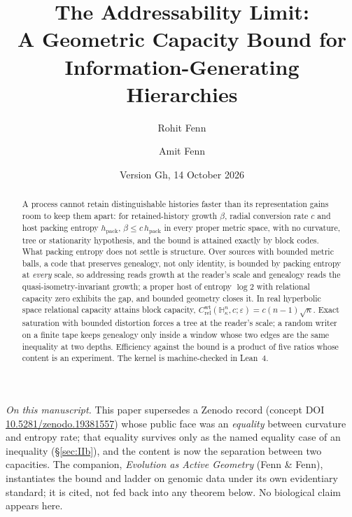 \documentclass[11pt,reqno]{amsart}
\theoremstyle{plain}
\theoremstyle{definition}
\newcommand{\hpack}{h_{\mathrm{pack}}}
\newcommand{\Crel}{C_{\mathrm{rel}}}
\newcommand{\Hk}{\mathbb{H}^n_\kappa}
\newcommand{\eps}{\varepsilon}
\begin{document}
\title[The Addressability Limit]{The Addressability Limit:\\ A Geometric Capacity Bound for Information-Generating Hierarchies}

\author{Rohit Fenn}
\author{Amit Fenn}
\address{Sentry Bio, Inc., USA}

\date{Version Gh, 14 October 2026}

\begin{abstract}
A process cannot retain distinguishable histories faster than its representation gains room to keep them apart: for retained-history growth $\beta$, radial conversion rate $c$ and host packing entropy $\hpack$, $\beta\le c\,\hpack$ in every proper metric space, with no curvature, tree or stationarity hypothesis, and the bound is attained exactly by block codes. What packing entropy does not settle is structure. Over sources with bounded metric balls, a code that preserves genealogy, not only identity, is bounded by packing entropy at \emph{every} scale, so addressing reads growth at the reader's scale and genealogy reads the quasi-isometry-invariant growth; a proper host of entropy $\log2$ with relational capacity zero exhibits the gap, and bounded geometry closes it. In real hyperbolic space relational capacity attains block capacity, $\Crel^{\mathrm{wt}}(\Hk,c;\eps)=c(n-1)\sqrt\kappa$. Exact saturation with bounded distortion forces a tree at the reader's scale; a random writer on a finite tape keeps genealogy only inside a window whose two edges are the same inequality at two depths. Efficiency against the bound is a product of five ratios whose content is an experiment. The kernel is machine-checked in Lean~4.
\end{abstract}

\maketitle

{\small\noindent\emph{On this manuscript.} This paper supersedes a Zenodo record (concept DOI \href{https://doi.org/10.5281/zenodo.19381557}{10.5281/zenodo.19381557}) whose public face was an \emph{equality} between curvature and entropy rate; that equality survives only as the named equality case of an inequality (\S\ref{sec:IIb}), and the content is now the separation between two capacities. The companion, \emph{Evolution as Active Geometry} (Fenn \& Fenn), instantiates the bound and ladder on genomic data under its own evidentiary standard; it is cited, not fed back into any theorem below. No biological claim appears here.\par}
\end{document}
